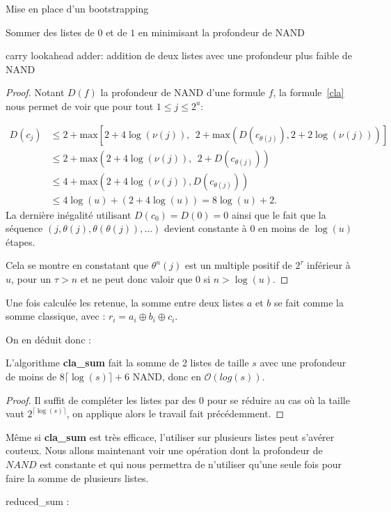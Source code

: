 \begin{section}{Mise en place d'un bootstrapping}
\begin{subsection}{Sommer des listes de $0$ et de $1$ en minimisant la profondeur de NAND}
\begin{subsubsection}{carry lookahead adder: addition de deux listes avec une profondeur plus faible de NAND}
\begin{proof}
	Notant $D(f)$ la profondeur de NAND d'une formule $f$, la formule~\eqref{cla} nous permet de voir que pour 
	tout $1 \leqslant j \leqslant 2^u $:

\begin{align*}
D(c_j) &\leqslant 2 + \text{max}\left[2 + 4 \log(\nu(j)),\:\: 2 + \text{max}\left(D(c_{\theta(j)}), 2 + 2
\log(\nu(j))\right)\right] \\
&\leqslant 2 + \text{max}\left(2 + 4 \log(\nu(j)),\:\: 2 + D(c_{\theta(j)})\right) \\
&\leqslant 4 + \text{max}\left(2 + 4 \log(\nu(j)), D(c_{\theta(j)})\right) \\
& \leqslant 4 \log(u) + (2 + 4\log(u)) = 8 \log(u) + 2.
\end{align*}
La dernière inégalité utilisant $D(c_0) = D(0) = 0$ ainsi que le fait que la séquence $(j, \theta(j), \theta(\theta(j)),
...)$ devient constante à 0 en moins de $\log(u)$ étapes. 

Cela se montre en constatant que $\theta^n(j)$ est un multiple positif de $2^\tau$ inférieur à $u$, pour un 
$\tau > n$ et ne peut donc valoir que $0$ si $n > \log(u)$.
\end{proof}

	Une fois calculée les retenue, la somme entre deux listes $a$ et $b$ se fait comme la somme classique, avec : $r_i = a_i \oplus b_i \oplus c_i$.

	On en déduit donc :

\begin{thm}
\label{cla_sum}
	L'algorithme \textbf{cla\_sum} fait la somme de 2 listes de taille $s$ avec une profondeur de moins de $8 \lceil \log(s) \rceil + 6$ NAND, donc en $\mathcal{O}(log(s))$.
\end{thm}

\begin{proof}
	Il suffit de compléter les listes par des 0 pour se réduire au cas où la taille vaut $2^{\lceil \log(s) \rceil}$, on applique alors le travail fait précédemment.
\end{proof}
\end{subsubsection}

Même si \textbf{cla\_sum} est très efficace, l'utiliser sur plusieurs listes peut s'avérer couteux.
Nous allons maintenant voir une opération dont la profondeur de $NAND$ est constante et qui nous permettra
de n'utiliser  qu'une seule fois pour faire la somme de plusieurs listes.
\begin{subsubsection}{reduced\_sum :}


\end{subsubsection}
\end{subsection}
\end{section}
